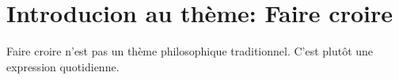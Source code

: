 \section{Introducion au thème: Faire croire}

Faire croire n'est pas un thème philosophique traditionnel. 
C'est plutôt une expression quotidienne.

\begin{ex}

\end{ex}